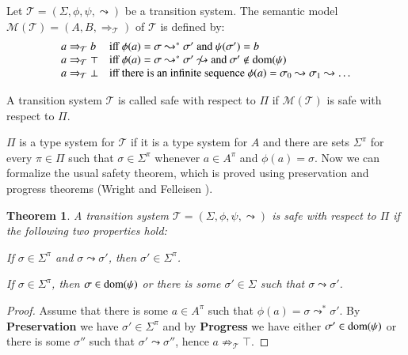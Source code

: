\documentclass[a4paper,final,preprint,sort&compress]{elsarticle}
\newtheorem{theorem}[definition]{Theorem}
\newcommand{\M}{\ensuremath{\mathcal{M}}}
\newcommand{\T}{\ensuremath{\mathcal{T}}}
\begin{document}
Let $\T = (\Sigma,\phi,\psi,\leadsto)$ be a transition system. The semantic model
\mbox{$\M(\T) = (A,B,\Rightarrow_\T)$} of $\T$ is defined by:
\[\begin{array}{ll}
  a \Rightarrow_\T b
  & \mbox{iff $\phi(a) = \sigma \leadsto^* \sigma'$ and $\psi(\sigma') = b$} \\
  a \Rightarrow_\T \top
  & \mbox{iff $\phi(a) = \sigma \leadsto^* \sigma' \not\leadsto$ and $\sigma' \not\in\dom(\psi)$} \\
  a \Rightarrow_\T \bot
  & \mbox{iff there is an infinite sequence $\phi(a) = \sigma_0 \leadsto \sigma_1 \leadsto \ldots$} \\
\end{array}\]

A transition system $\T$ is called safe with respect to $\Pi$ if $\M(\T)$ is safe with respect to $\Pi$.

$\Pi$ is a type system for $\T$ if it is a type system for $A$ and there are sets $\Sigma^\pi$ for
every $\pi \in \Pi$ such that $\sigma \in \Sigma^\pi$ whenever $a \in A^\pi$ and $\phi(a) = \sigma$.
Now we can formalize the usual safety theorem, which is proved using preservation and progress
theorems (Wright and Felleisen \cite{WrightFelleisen94}).

\begin{theorem}
  A transition system $\T = (\Sigma,\phi,\psi,\leadsto)$ is safe with respect to $\Pi$
  if the following two properties hold:
  \begin{description}[labelindent=\parindent,style=nextline]
  \item[Preservation] 

    If $\sigma \in \Sigma^\pi$ and $\sigma \leadsto \sigma'$, then $\sigma' \in \Sigma^\pi$.

  \item[Progress] 

    If \mbox{$\sigma \in \Sigma^\pi$}, then \mbox{$\sigma \in \operatorname{dom}(\psi)$} or there is some
    \mbox{$\sigma' \in \Sigma$} such that \mbox{$\sigma \leadsto \sigma'$}.
    
  \end{description}
\end{theorem}

\begin{proof}
  Assume that there is some $a \in A^\pi$ such that \mbox{$\phi(a) = \sigma \leadsto^* \sigma'$}.
  By \textbf{Preservation} we have $\sigma' \in \Sigma^\pi$ and by \textbf{Progress} we have either
  $\sigma' \in \operatorname{dom}(\psi)$ or there is some $\sigma''$ such that $\sigma' \leadsto \sigma''$,
  hence $a \not\Rightarrow_\T \top$.
\end{proof}
\end{document}
